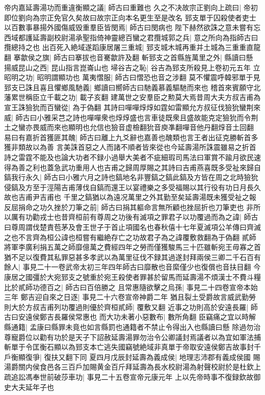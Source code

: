 帝内嘉延壽湯功而重違衡顯之議|{
	師古曰重難也}
久之不决故宗正劉向上疏曰|{
	帝初即位劉向為宗正免官久矣故曰故宗正向本名更生至是改名}
郅支單于囚殺使者吏士以百數事暴揚外國傷威毁重羣臣皆閔焉|{
	師古曰閔病也}
陛下赫然欲誅之意未嘗有忘西域都護延壽副校尉湯承聖指倚神靈總百蠻之君攬城郭之兵|{
	意之所向為指師古曰攬總持之也}
出百死入絶域遂蹈康居屠三重城|{
	郅支城木城再重并土城為三重重直龍翻}
搴歙侯之旗|{
	師古曰搴拔也音騫歙許及翻}
斬郅支之首縣旌萬里之外|{
	縣讀曰懸}
揚威昆山之西|{
	昆山指言崑崙山也}
埽谷吉之恥|{
	谷吉為郅支所殺見上卷初元五年}
立昭明之功|{
	昭明謂顯功也}
萬夷慴服|{
	師古曰慴恐也音之涉翻}
莫不懼震呼韓邪單于見郅支已誅且喜且懼鄉風馳義|{
	鄉讀曰嚮師古曰馳義慕義驅馳而來也}
稽首來賓願守北藩累世稱臣立千載之功|{
	載子亥翻}
建萬世之安羣臣之勲莫大焉昔周大夫方叔吉甫為宣王誅獫狁而百蠻從|{
	為于偽翻}
其詩曰嘽嘽焞焞如霆如雷顯允方叔征伐獫狁蠻荆來威|{
	師古曰小雅采芑之詩也嘽嘽衆也焞焞盛也言車徒既衆且盛故能克定獫狁而令荆土之蠻亦畏威而來也顯明也允信也獫音虚檢翻狁音庾凖翻嘽音他丹翻焞音土回翻}
易曰有嘉折首獲匪其醜|{
	師古曰離上九爻辭也嘉善也醜類也言王者出征克勝斬首多獲非類故以為善}
言美誅首惡之人而諸不順者皆來從也今延壽湯所誅震雖易之折首詩之雷霆不能及也論大功者不録小過舉大美者不疵細瑕司馬法曰軍賞不踰月欲民速得為善之利也蓋急武功重用人也吉甫之歸周厚賜之其詩曰吉甫燕喜既多受祉來歸自鎬我行永久|{
	師古曰小雅六月之詩也鎬地名非豐鎬之鎬此鎬及方皆在周之北時獫狁侵鎬及方至于涇陽吉甫薄伐自鎬而還王以宴禮樂之多受福賜以其行役有功日月長久故也吉甫尹吉甫也}
千里之鎬猶以為遠况萬里之外其勤至矣延壽湯既未獲受祉之報反屈捐命之功久挫於刀筆之前|{
	師古曰捐其軀命言無所顧也挫屈折也刀筆吏也}
非所以厲有功勸戎士也昔齊桓前有尊周之功後有滅項之罪君子以功覆過而為之諱|{
	師古曰尊周謂伐楚責苞茅及會王世子于首止項國名也春秋僖十七年夏滅項公羊傳曰齊滅之也不言齊為桓公諱也桓嘗有繼絶存亡之功故君子為之諱覆敷救翻為于偽翻}
貳師將軍李廣利捐五萬之師靡億萬之費經四年之勞而僅獲駿馬三十匹雖斬宛王毋寡之首猶不足以復費其私罪惡甚多孝武以為萬里征伐不録其過遂封拜兩侯三卿二千石百有餘人|{
	事見二十一卷武帝太初三年四年師古曰靡散也音縻僅少也復償也音扶目翻}
今康居之國彊於大宛郅支之號重於宛王殺使者罪甚於留馬而延壽湯不煩漢士不費斗糧比於貳師功德百之|{
	師古曰百倍勝之}
且常惠隨欲擊之烏孫|{
	事見二十四卷宣帝本始三年}
鄭吉迎自來之日逐|{
	事見二十六卷宣帝神爵二年}
猶且裂土受爵故言威武勤勞則大於方叔吉甫列功覆過則優於齊桓貳師|{
	覆敷又翻}
近事之功則高於安遠長羅|{
	師古曰安遠侯鄭吉長羅侯常惠也}
而大功未著小惡數布|{
	數所角翻}
臣竊痛之宜以時解縣通籍|{
	孟康曰縣罪未竟也如言縣罰也通籍者不禁止令得出入也縣讀曰懸}
除過勿治尊寵爵位以勸有功於是天子下詔赦延壽湯罪勿治令公卿議封焉議者以為宜如軍法捕斬單于令匡衡石顯以為郅支本亡逃失國竊號絶域非真單于帝取安遠侯鄭吉故事封千戶衡顯復爭|{
	復扶又翻下同}
夏四月戊辰封延壽為義成侯|{
	地理志沛郡有義成侯國}
賜湯爵關内侯食邑各三百戶加賜黄金百斤拜延壽為長水校尉湯為射聲校尉於是杜欽上疏追訟馮奉世前破莎車功|{
	事見二十五卷宣帝元康元年}
上以先帝時事不復録欽故御史大夫延年子也

